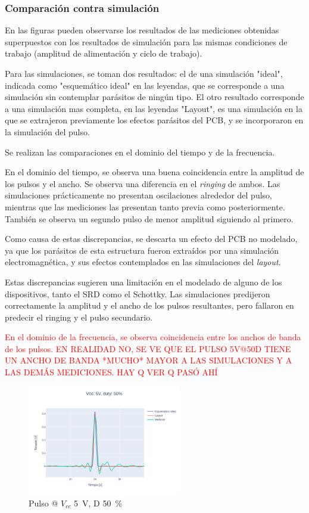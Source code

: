 \subsubsection{Comparación contra simulación}

En las figuras pueden observarse los resultados de las mediciones obtenidas
superpuestos con los resultados de simulación para las mismas condiciones de
trabajo (amplitud de alimentación y ciclo de trabajo).

Para las simulaciones, se toman dos resultados: el de una simulación "ideal", 
indicada como "esquemático ideal" en las leyendas, que se corresponde a una simulación
sin contemplar parásitos de ningún tipo. El otro resultado corresponde a una simulación
mas completa, en las leyendas "Layout", es una simulación en la que se extrajeron
previamente los efectos parásitos del PCB, y se incorporaron en la simulación
del pulso.

Se realizan las comparaciones en el dominio del tiempo y de la frecuencia.

En el dominio del tiempo, se observa una buena coincidencia entre la amplitud
de los pulsos y el ancho. Se observa una diferencia en el \textit{ringing} de ambos.
Las simulaciones prácticamente no presentan oscilaciones alrededor del pulso,
mientras que las mediciones las presentan tanto previa como posteriormente.
También se observa un segundo pulso de menor amplitud siguiendo al primero.

Como causa de estas discrepancias, se descarta un efecto del PCB no modelado, 
ya que los parásitos de esta estructura fueron extraídos por una simulación 
electromagnética, y sus efectos contemplados en las simulaciones del \textit{layout}.

Estas  discrepancias sugieren una limitación en el modelado de alguno de los 
dispositivos, tanto el SRD como el Schottky. Las simulaciones predijeron correctamente
la amplitud y el ancho de los pulsos resultantes, pero fallaron en predecir 
el ringing y el pulso secundario.

\textcolor{red}{  
En el dominio de la frecuencia, se observa coincidencia entre los anchos de banda de los
pulsos.
EN REALIDAD NO, SE VE QUE EL PULSO 5V@50D TIENE UN ANCHO DE BANDA *MUCHO* MAYOR A 
LAS SIMULACIONES Y A LAS DEMÁS MEDICIONES.
HAY Q VER Q PASÓ AHÍ
}

\begin{figure}
  \centering
    \includegraphics[width=0.6\textwidth]{images/plots/Vcc_5V_duty_50_time_domain.png}
    \caption{Pulso @ $V_{cc}$ \qty{5}{\volt}, D \qty{50}{\percent} }
    \label{fig:plots_5v_50}
\end{figure}

